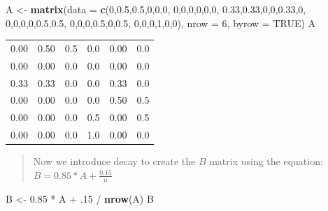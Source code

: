 \documentclass[]{article}
\newenvironment{Shaded}{\begin{snugshade}}{\end{snugshade}}
\newcommand{\KeywordTok}[1]{\textcolor[rgb]{0.13,0.29,0.53}{\textbf{{#1}}}}
\newcommand{\DataTypeTok}[1]{\textcolor[rgb]{0.13,0.29,0.53}{{#1}}}
\newcommand{\DecValTok}[1]{\textcolor[rgb]{0.00,0.00,0.81}{{#1}}}
\newcommand{\FloatTok}[1]{\textcolor[rgb]{0.00,0.00,0.81}{{#1}}}
\newcommand{\StringTok}[1]{\textcolor[rgb]{0.31,0.60,0.02}{{#1}}}
\newcommand{\OtherTok}[1]{\textcolor[rgb]{0.56,0.35,0.01}{{#1}}}
\newcommand{\NormalTok}[1]{{#1}}
\begin{document}
\begin{Shaded}
\begin{Highlighting}[]
\NormalTok{A <-}\StringTok{ }\KeywordTok{matrix}\NormalTok{(}\DataTypeTok{data =} \KeywordTok{c}\NormalTok{(}\DecValTok{0}\NormalTok{,}\FloatTok{0.5}\NormalTok{,}\FloatTok{0.5}\NormalTok{,}\DecValTok{0}\NormalTok{,}\DecValTok{0}\NormalTok{,}\DecValTok{0}\NormalTok{, }
                     \DecValTok{0}\NormalTok{,}\DecValTok{0}\NormalTok{,}\DecValTok{0}\NormalTok{,}\DecValTok{0}\NormalTok{,}\DecValTok{0}\NormalTok{,}\DecValTok{0}\NormalTok{,}
                     \FloatTok{0.33}\NormalTok{,}\FloatTok{0.33}\NormalTok{,}\DecValTok{0}\NormalTok{,}\DecValTok{0}\NormalTok{,}\FloatTok{0.33}\NormalTok{,}\DecValTok{0}\NormalTok{,}
                     \DecValTok{0}\NormalTok{,}\DecValTok{0}\NormalTok{,}\DecValTok{0}\NormalTok{,}\DecValTok{0}\NormalTok{,}\FloatTok{0.5}\NormalTok{,}\FloatTok{0.5}\NormalTok{,}
                     \DecValTok{0}\NormalTok{,}\DecValTok{0}\NormalTok{,}\DecValTok{0}\NormalTok{,}\FloatTok{0.5}\NormalTok{,}\DecValTok{0}\NormalTok{,}\FloatTok{0.5}\NormalTok{,}
                     \DecValTok{0}\NormalTok{,}\DecValTok{0}\NormalTok{,}\DecValTok{0}\NormalTok{,}\DecValTok{1}\NormalTok{,}\DecValTok{0}\NormalTok{,}\DecValTok{0}\NormalTok{), }\DataTypeTok{nrow =} \DecValTok{6}\NormalTok{,  }\DataTypeTok{byrow =} \OtherTok{TRUE}\NormalTok{)}
\NormalTok{A}
\end{Highlighting}
\end{Shaded}

\begin{longtable}[]{@{}rrrrrr@{}}
\toprule
0.00 & 0.50 & 0.5 & 0.0 & 0.00 & 0.0\tabularnewline
0.00 & 0.00 & 0.0 & 0.0 & 0.00 & 0.0\tabularnewline
0.33 & 0.33 & 0.0 & 0.0 & 0.33 & 0.0\tabularnewline
0.00 & 0.00 & 0.0 & 0.0 & 0.50 & 0.5\tabularnewline
0.00 & 0.00 & 0.0 & 0.5 & 0.00 & 0.5\tabularnewline
0.00 & 0.00 & 0.0 & 1.0 & 0.00 & 0.0\tabularnewline
\bottomrule
\end{longtable}

\begin{quote}
Now we introduce decay to create the \(B\) matrix using the equation:
\(B = 0.85 * A + \frac{0.15}{n}\)
\end{quote}

\begin{Shaded}
\begin{Highlighting}[]
\NormalTok{B <-}\StringTok{ }\FloatTok{0.85} \NormalTok{*}\StringTok{ }\NormalTok{A +}\StringTok{ }\NormalTok{.}\DecValTok{15} \NormalTok{/}\StringTok{ }\KeywordTok{nrow}\NormalTok{(A)}
\NormalTok{B}
\end{Highlighting}
\end{Shaded}
\end{document}

